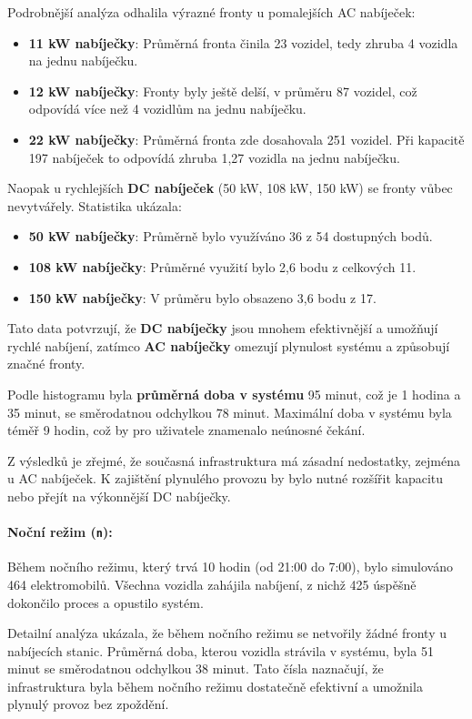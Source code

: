 \documentclass[a4paper,11pt]{article}
\begin{document}
Podrobnější analýza odhalila výrazné fronty u pomalejších AC nabíječek:
\begin{itemize}
    \item \textbf{11 kW nabíječky}: Průměrná fronta činila 23 vozidel, tedy zhruba 4 vozidla na jednu nabíječku.
    \item \textbf{12 kW nabíječky}: Fronty byly ještě delší, v průměru 87 vozidel, což odpovídá více než 4 vozidlům na jednu nabíječku.
    \item \textbf{22 kW nabíječky}: Průměrná fronta zde dosahovala 251 vozidel. Při kapacitě 197 nabíječek to odpovídá zhruba 1,27 vozidla na jednu nabíječku.
\end{itemize}

Naopak u rychlejších \textbf{DC nabíječek} (50 kW, 108 kW, 150 kW) se fronty vůbec nevytvářely. Statistika ukázala:
\begin{itemize}
    \item \textbf{50 kW nabíječky}: Průměrně bylo využíváno 36 z 54 dostupných bodů.
    \item \textbf{108 kW nabíječky}: Průměrné využití bylo 2,6 bodu z celkových 11.
    \item \textbf{150 kW nabíječky}: V průměru bylo obsazeno 3,6 bodu z 17.
\end{itemize}

Tato data potvrzují, že \textbf{DC nabíječky} jsou mnohem efektivnější a umožňují rychlé nabíjení, zatímco \textbf{AC nabíječky} omezují plynulost systému a způsobují značné fronty.

Podle histogramu byla \textbf{průměrná doba v systému} 95 minut, což je 1 hodina a 35 minut, se směrodatnou odchylkou 78 minut. Maximální doba v systému byla téměř 9 hodin, což by pro uživatele znamenalo neúnosné čekání. 

Z výsledků je zřejmé, že současná infrastruktura má zásadní nedostatky, zejména u AC nabíječek. K zajištění plynulého provozu by bylo nutné rozšířit kapacitu nebo přejít na výkonnější DC nabíječky.

\paragraph{Noční režim (\texttt{n}):} 
Během nočního režimu, který trvá 10 hodin (od 21:00 do 7:00), bylo simulováno 464 elektromobilů. Všechna vozidla zahájila nabíjení, z nichž 425 úspěšně dokončilo proces a opustilo systém. 

Detailní analýza ukázala, že během nočního režimu se netvořily žádné fronty u nabíjecích stanic. Průměrná doba, kterou vozidla strávila v systému, byla 51 minut se směrodatnou odchylkou 38 minut. Tato čísla naznačují, že infrastruktura byla během nočního režimu dostatečně efektivní a umožnila plynulý provoz bez zpoždění.
\end{document}
